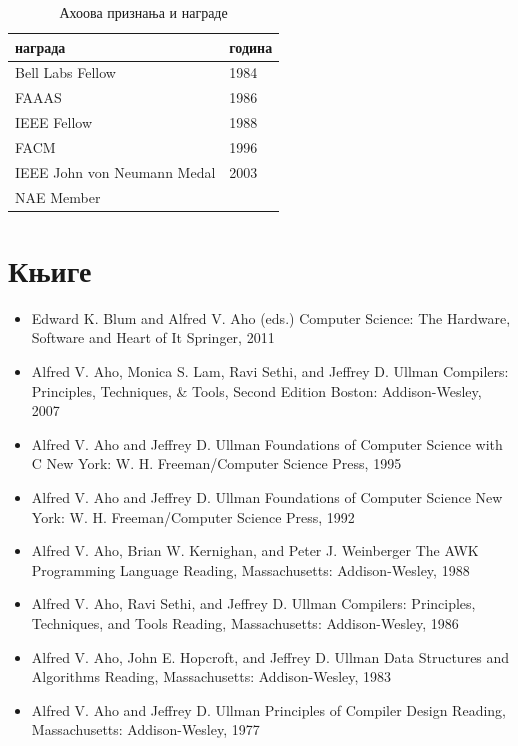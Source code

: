 \documentclass[a4paper]{article}
\begin{document}
\begin{table}[h!]
\begin{center}
\caption{Ахоова признања и награде}
\begin{tabular}{|l|l|} \hline
награда& година\\ \hline
Bell Labs Fellow &1984\\ \hline
FAAAS &1986\\ \hline
IEEE Fellow &1988\\ \hline
FACM &1996\\ \hline
IEEE John von Neumann Medal &2003\\ \hline
NAE Member &\\ \hline

\end{tabular}
\label{tab:tabela1}
\end{center}
\end{table}

\section{Књиге}

\label{sec:knjige}

\begin{itemize}
    \item Edward K. Blum and Alfred V. Aho (eds.)
    Computer Science: The Hardware, Software and Heart of It
    Springer, 2011 
    
    \item Alfred V. Aho, Monica S. Lam, Ravi Sethi, and Jeffrey D. Ullman
    Compilers: Principles, Techniques, & Tools, Second Edition
    Boston: Addison-Wesley, 2007 
    
    \item Alfred V. Aho and Jeffrey D. Ullman
    Foundations of Computer Science with C
    New York: W. H. Freeman/Computer Science Press, 1995
    
    \item Alfred V. Aho and Jeffrey D. Ullman
    Foundations of Computer Science
    New York: W. H. Freeman/Computer Science Press, 1992 
    
    \item Alfred V. Aho, Brian W. Kernighan, and Peter J. Weinberger
    The AWK Programming Language
    Reading, Massachusetts: Addison-Wesley, 1988 
    
    \item Alfred V. Aho, Ravi Sethi, and Jeffrey D. Ullman
    Compilers: Principles, Techniques, and Tools
    Reading, Massachusetts: Addison-Wesley, 1986

    \item Alfred V. Aho, John E. Hopcroft, and Jeffrey D. Ullman
    Data Structures and Algorithms
    Reading, Massachusetts: Addison-Wesley, 1983

    \item Alfred V. Aho and Jeffrey D. Ullman
    Principles of Compiler Design
    Reading, Massachusetts: Addison-Wesley, 1977


    
\end{itemize}
\end{document}
